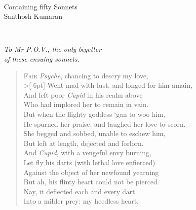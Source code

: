 \documentclass[a5paper, 12pt, oneside]{memoir}
\begin{document}
\begin{titlingpage}
\null  %
\nointerlineskip  %
\vfill
\let\snewpage \newpage
\let\newpage \relax

\centering
{\HUGE {}} \\[5pt]
{\Large Containing fifty Sonnets} \\[10pt]
{\large Santhosh Kumaran}

\let \newpage \snewpage
\vfill 
\break %
\end{titlingpage}

\newpage
~
\vspace{1cm}

\begin{center}
    \itshape
    To Mr P.O.V., the only begetter \\
    of these ensuing sonnets. \\
    
\end{center}

\newpage

\PoemTitle{}
\begin{verse}
    \lettrine{F}{air} \textit{Psyche}, chancing to descry my love, \\>[-6pt]
    Went mad with lust, and longed for him amain, \\
    And left poor \textit{Cupid} in his realm above \\
    Who had implored her to remain in vain. \\
    But when the flighty goddess `gan to woo him, \\
    He spurned her praise, and laughed her love to scorn. \\
    She begged and sobbed, unable to eschew him, \\
    But left at length, dejected and forlorn. \\
    And \textit{Cupid}, with a vengeful envy burning, \\
    Let fly his darts (with lethal love enfierced) \\
    Against the object of her newfound yearning \\
    But ah, his flinty heart could not be pierced. \\
    \vin Nay, it deflected each and every dart \\
    \vin Into a milder prey: my heedless heart.
\end{verse}
\end{document}
